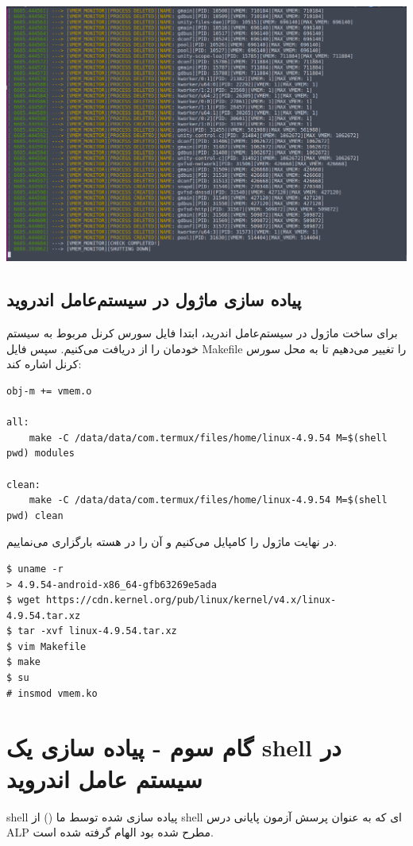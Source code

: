 \documentclass{article}
\begin{document}
\includegraphics[width=\textwidth]{images/vmem_output}
 
 
 \subsection{پیاده سازی ماژول در سیستم‌عامل اندروید}
 برای ساخت ماژول در سیستم‌عامل اندرید، ابتدا فایل سورس کرنل مربوط به سیستم خودمان را از 
 دریافت می‌کنیم.
 سپس فایل Makefile را تغییر می‌دهیم تا به محل سورس کرنل اشاره کند:

\begin{latin}
\begin{verbatim}
obj-m += vmem.o

all:
    make -C /data/data/com.termux/files/home/linux-4.9.54 M=$(shell pwd) modules

clean:
    make -C /data/data/com.termux/files/home/linux-4.9.54 M=$(shell pwd) clean

\end{verbatim}	
\end{latin}

در نهایت ماژول را کامپایل می‌کنیم و آن را در هسته بارگزاری می‌نماییم.
\cite{8}
 
\begin{latin}
\begin{verbatim}
$ uname -r
> 4.9.54-android-x86_64-gfb63269e5ada
$ wget https://cdn.kernel.org/pub/linux/kernel/v4.x/linux-4.9.54.tar.xz
$ tar -xvf linux-4.9.54.tar.xz
$ vim Makefile
$ make
$ su
# insmod vmem.ko
\end{verbatim}	
\end{latin}

\section{گام سوم - پیاده سازی یک shell در سیستم عامل اندروید}
shell 
پیاده سازی شده توسط ما () از shell ای که به عنوان پرسش آزمون پایانی درس ALP
مطرح شده بود الهام گرفته شده است.
\end{document}
